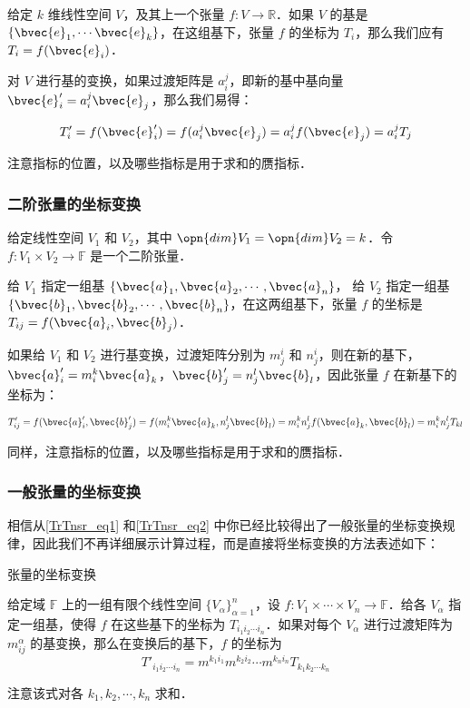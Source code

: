 给定 $k$ 维线性空间 $V$，及其上一个张量 $f:V\rightarrow\mathbb{R}$．如果 $V$ 的基是 $\{\bvec{e}_1, \cdots\bvec{e}_k\}$，在这组基下，张量 $f$ 的坐标为 $T_{i}$，那么我们应有 $T_{i}=f(\bvec{e}_i)$．

对 $V$ 进行基的变换，如果过渡矩阵是 $a_{i}^j$，即新的基中基向量 $\bvec{e}'_{i}=a_{i}^j\bvec{e}_j$，那么我们易得：

\begin{equation}\label{TrTnsr_eq1}
T'_{i}=f(\bvec{e}'_i)=f(a_{i}^j\bvec{e}_j)=a_{i}^jf(\bvec{e}_j)=a_{i}^jT_{j}
\end{equation}

注意指标的位置，以及哪些指标是用于求和的赝指标．

\subsubsection{二阶张量的坐标变换}

给定线性空间 $V_1$ 和 $V_2$，其中 $\opn{dim}V_1=\opn{dim}V_2=k$．令 $f:V_1\times V_2\rightarrow\mathbb{F}$ 是一个二阶张量．

给 $V_1$ 指定一组基 $\{\bvec{a}_1, \bvec{a}_2, \cdots, \bvec{a}_n\}$， 给 $V_2$ 指定一组基 $\{\bvec{b}_1, \bvec{b}_2, \cdots, \bvec{b}_n\}$，在这两组基下，张量 $f$ 的坐标是 $T_{ij}=f(\bvec{a}_i, \bvec{b}_j)$．

如果给 $V_1$ 和 $V_2$ 进行基变换，过渡矩阵分别为 $m^{i}_j$ 和 $n^{i}_j$，则在新的基下，$\bvec{a}'_i=m^{k}_i\bvec{a}_k$，$\bvec{b}'_j=n^{l}_j\bvec{b}_l$，因此张量 $f$ 在新基下的坐标为：

\begin{equation}\label{TrTnsr_eq2}
T'_{ij}=f(\bvec{a}'_i, \bvec{b}'_j)=f(m^{k}_i\bvec{a}_k, n^{l}_j\bvec{b}_l)=m^{k}_in^{l}_jf(\bvec{a}_k, \bvec{b}_l)=m^{k}_in^{l}_jT_{kl}
\end{equation}

同样，注意指标的位置，以及哪些指标是用于求和的赝指标．

\subsubsection{一般张量的坐标变换}

相信从\autoref{TrTnsr_eq1} 和\autoref{TrTnsr_eq2} 中你已经比较得出了一般张量的坐标变换规律，因此我们不再详细展示计算过程，而是直接将坐标变换的方法表述如下：

\begin{theorem}{张量的坐标变换}

给定域 $\mathbb{F}$ 上的一组有限个线性空间 $\{V_\alpha\}^n_{\alpha=1}$，设 $f:V_1\times\cdots\times V_n\rightarrow\mathbb{F}$．给各 $V_\alpha$ 指定一组基，使得 $f$ 在这些基下的坐标为 $T_{i_1i_2\cdots i_n}$．如果对每个 $V_\alpha$ 进行过渡矩阵为 $m^\alpha_{ij}$ 的基变换，那么在变换后的基下，$f$ 的坐标为
\begin{equation}
T'_{i_1i_2\cdots i_n}=m^{k_1i_1}m^{k_2i_2}\cdots m^{k_ni_n}T_{k_1k_2\cdots k_n}
\end{equation}

注意该式对各 $k_1, k_2, \cdots, k_n$ 求和．
\end{theorem}

